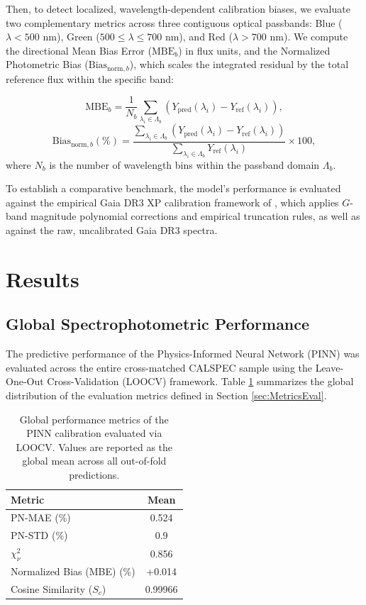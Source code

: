 \documentclass{aa}
\begin{document}
Then, to detect localized, wavelength-dependent calibration biases, we evaluate two complementary metrics across three contiguous optical passbands: Blue ($\lambda < 500\text{ nm}$), Green ($500 \le \lambda \le 700\text{ nm}$), and Red ($\lambda > 700\text{ nm}$). We compute the directional Mean Bias Error ($\text{MBE}_b$) in flux units, and the Normalized Photometric Bias ($\text{Bias}_{\text{norm}, b}$), which scales the integrated residual by the total reference flux within the specific band:

\begin{equation}
    \text{MBE}_b = \frac{1}{N_b} \sum_{\lambda_i \in \Lambda_b} \left( Y_{\text{pred}}(\lambda_i) - Y_{\text{ref}}(\lambda_i) \right),
\end{equation}
\begin{equation}
    \text{Bias}_{\text{norm}, b} (\%) = \frac{\sum_{\lambda_i \in \Lambda_b} \left( Y_{\text{pred}}(\lambda_i) - Y_{\text{ref}}(\lambda_i) \right)}{\sum_{\lambda_i \in \Lambda_b} Y_{\text{ref}}(\lambda_i)} \times 100,
\end{equation}
where $N_b$ is the number of wavelength bins within the passband domain $\Lambda_b$.

To establish a comparative benchmark, the model's performance is evaluated against the empirical Gaia DR3 XP calibration framework of \citet{huang2024}, which applies $G$-band magnitude polynomial corrections and empirical truncation rules, as well as against the raw, uncalibrated Gaia DR3 spectra.



\section{Results} \label{sec:Results}

\subsection{Global Spectrophotometric Performance}

The predictive performance of the Physics-Informed Neural Network (PINN) was evaluated across the entire cross-matched CALSPEC sample using the Leave-One-Out Cross-Validation (LOOCV) framework. Table \ref{tab:global_metrics} summarizes the global distribution of the evaluation metrics defined in Section \ref{sec:MetricsEval}.

\begin{table}[h]
\caption{Global performance metrics of the PINN calibration evaluated via LOOCV. Values are reported as the global mean across all out-of-fold predictions.}
\label{tab:global_metrics}
\centering
\begin{tabular}{lc}
\hline\hline
Metric & Mean \\
\hline
PN-MAE (\%) & 0.524 \\
PN-STD (\%) & 0.9 \\
$\chi^2_\nu$ & 0.856 \\
Normalized Bias (MBE) (\%) & +0.014 \\
Cosine Similarity ($S_c$) & 0.99966 \\
\hline
\end{tabular}
\end{table}
\end{document}
